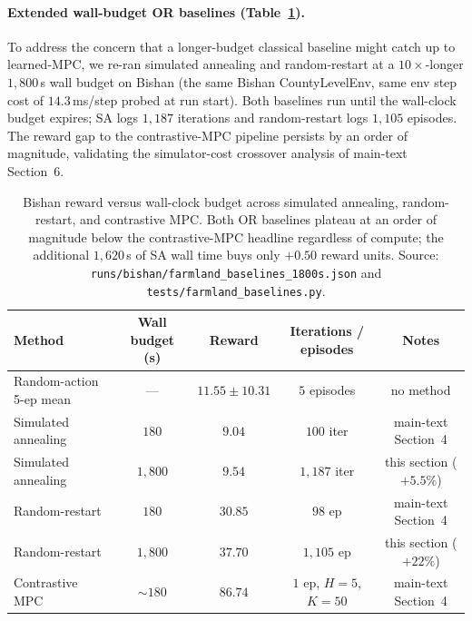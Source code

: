 \documentclass[11pt]{article}
\begin{document}
\paragraph{Extended wall-budget OR baselines (Table~\ref{tab:si-1800s-baselines}).} To address the concern that a longer-budget classical baseline might catch up to learned-MPC, we re-ran simulated annealing and random-restart at a $10\times$-longer $1{,}800$\,s wall budget on Bishan (the same Bishan CountyLevelEnv, same env step cost of $14.3$\,ms/step probed at run start). Both baselines run until the wall-clock budget expires; SA logs $1{,}187$ iterations and random-restart logs $1{,}105$ episodes. The reward gap to the contrastive-MPC pipeline persists by an order of magnitude, validating the simulator-cost crossover analysis of main-text Section~6.

\begin{table}[htbp]
\centering
\small
\caption{Bishan reward versus wall-clock budget across simulated annealing, random-restart, and contrastive MPC. Both OR baselines plateau at an order of magnitude below the contrastive-MPC headline regardless of compute; the additional $1{,}620$\,s of SA wall time buys only $+0.50$ reward units. Source: \texttt{runs/bishan/farmland\_baselines\_1800s.json} and \texttt{tests/farmland\_baselines.py}.}
\label{tab:si-1800s-baselines}
\begin{tabular}{lcccc}
\toprule
Method & Wall budget (s) & Reward & Iterations / episodes & Notes \\
\midrule
Random-action 5-ep mean & — & $11.55 \pm 10.31$ & $5$ episodes & no method \\
\midrule
Simulated annealing & $180$ & $9.04$ & $100$ iter & main-text Section~4 \\
Simulated annealing & $1{,}800$ & $9.54$ & $1{,}187$ iter & this section ($+5.5\%$) \\
Random-restart & $180$ & $30.85$ & $98$ ep & main-text Section~4 \\
Random-restart & $1{,}800$ & $37.70$ & $1{,}105$ ep & this section ($+22\%$) \\
\midrule
Contrastive MPC & $\sim 180$ & $\mathbf{86.74}$ & $1$ ep, $H{=}5$, $K{=}50$ & main-text Section~4 \\
\bottomrule
\end{tabular}
\end{table}
\end{document}
